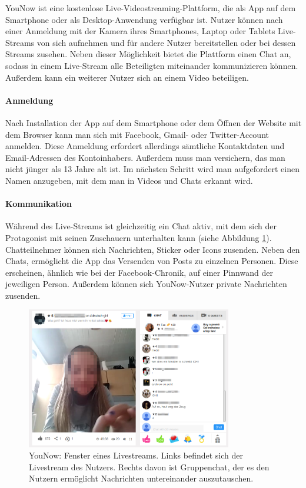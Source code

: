 YouNow ist eine kostenlose Live-Videostreaming-Plattform, die als App auf dem
Smartphone oder als Desktop-Anwendung verfügbar ist. Nutzer können nach einer
Anmeldung mit der Kamera ihres Smartphones, Laptop oder Tablets Live-Streams
von sich aufnehmen und für andere Nutzer bereitstellen oder bei dessen Streams
zusehen. Neben dieser Möglichkeit bietet die Plattform einen Chat an, sodass in
einem Live-Stream alle Beteiligten miteinander kommunizieren können. Außerdem
kann ein weiterer Nutzer sich an einem Video beteiligen.

\paragraph{Anmeldung}
Nach Installation der App auf dem Smartphone oder dem Öffnen der Website mit dem Browser kann man sich mit Facebook, Gmail- oder Twitter-Account anmelden. Diese Anmeldung erfordert allerdings sämtliche Kontaktdaten und Email-Adressen des Kontoinhabers. Außerdem muss man versichern, das man nicht jünger als 13 Jahre alt ist.
Im nächsten Schritt wird man aufgefordert einen Namen anzugeben, mit dem man in Videos und Chats erkannt wird.

\paragraph{Kommunikation}
Während des Live-Streams ist gleichzeitig ein Chat aktiv, mit dem sich der Protagonist mit seinen Zuschauern unterhalten kann (siehe Abbildung \ref{stream_with_chat}). Chatteilnehmer können sich Nachrichten, Sticker oder Icons zusenden. Neben den Chats, ermöglicht die App das Versenden von Posts zu einzelnen Personen. Diese erscheinen, ähnlich wie bei der Facebook-Chronik, auf einer Pinnwand der jeweiligen Person. Außerdem können sich YouNow-Nutzer private Nachrichten zusenden.

\begin{figure}[!ht]
\centering
\includegraphics[width=0.8\textwidth]{./resources/younow_stream_with_chat}
\caption{YouNow: Fenster eines Livestreams. Links befindet sich der Livestream des Nutzers. Rechts davon ist Gruppenchat, der es den Nutzern erm\"oglicht Nachrichten untereinander auszutauschen.}
\label{stream_with_chat}
\end{figure} 

